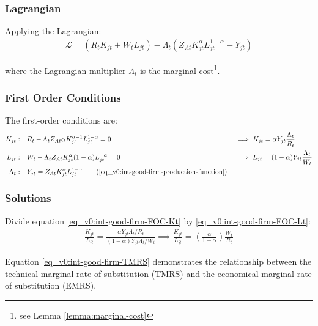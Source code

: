 \documentclass[
thesis.tex
]{subfiles}
\begin{document}
	
	\subsubsection*{Lagrangian}
	
	Applying the Lagrangian:
	\begin{align}
		\label{eq_v0:int-good-firm-lagrangian}
		\mathcal{L} = (R_t K_{jt} + W_t L_{jt}) - \Lambda_t (Z_{At} K_{jt}^\alpha L_{jt}^{1-\alpha} - Y_{jt})
	\end{align}
	
	where the Lagrangian multiplier $\Lambda_t$ is the marginal cost\footnote{see Lemma \ref{lemma:marginal-cost}}.
	
	\subsubsection*{First Order Conditions}
	
	The first-order conditions are:
	\begin{alignat}{2}
		K_{jt}: \quad & R_t - \Lambda_t Z_{At} \alpha K_{jt}^{\alpha-1} L_{jt}^{1-\alpha} = 0 &&\implies K_{jt} = \alpha Y_{jt} \frac{\Lambda_t}{R_t} \label{eq_v0:int-good-firm-FOC-Kt} \\
		L_{jt}: \quad & W_t - \Lambda_t Z_{At} K_{jt}^\alpha (1-\alpha) L_{jt}^{-\alpha} = 0 \quad &&\implies L_{jt} = (1-\alpha) Y_{jt} \frac{\Lambda_t}{W_t} \label{eq_v0:int-good-firm-FOC-Lt} \\
		\Lambda_t: \quad & Y_{jt} = Z_{At} K_{jt}^\alpha L_{jt}^{1-\alpha} \tag{\ref{eq_v0:int-good-firm-production-function}}
	\end{alignat}
	
	\subsubsection*{Solutions}
	
	Divide equation \ref{eq_v0:int-good-firm-FOC-Kt} by \ref{eq_v0:int-good-firm-FOC-Lt}:
	\begin{align}
		\frac{K_{jt}}{L_{jt}} = \frac{\alpha Y_{jt} \Lambda_t /R_t}{(1-\alpha) Y_{jt} \Lambda_t /W_t} \implies
		\frac{K_{jt}}{L_{jt}} = \left( \frac{\alpha}{1-\alpha} \right) \frac{W_t}{R_t} \label{eq_v0:int-good-firm-TMRS}
	\end{align}
	
	Equation \ref{eq_v0:int-good-firm-TMRS} demonstrates the relationship between the technical marginal rate of substitution (TMRS) and the economical marginal rate of substitution (EMRS). 
	
\end{document}
